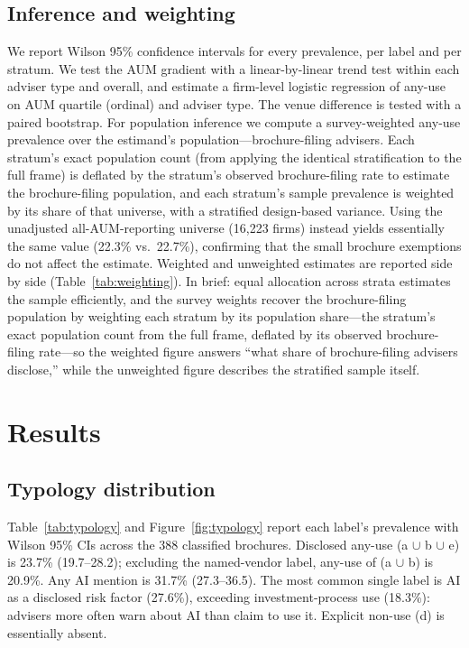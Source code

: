 \documentclass[utf8]{FrontiersinHarvard} %
\begin{document}
\subsection{Inference and weighting}
We report Wilson 95\% confidence intervals for every prevalence, per label and per stratum. We test the AUM gradient with a linear-by-linear trend test within each adviser type and overall, and estimate a firm-level logistic regression of any-use on AUM quartile (ordinal) and adviser type. The venue difference is tested with a paired bootstrap. For population inference we compute a survey-weighted any-use prevalence over the estimand's population---brochure-filing advisers. Each stratum's exact population count (from applying the identical stratification to the full frame) is deflated by the stratum's observed brochure-filing rate to estimate the brochure-filing population, and each stratum's sample prevalence is weighted by its share of that universe, with a stratified design-based variance. Using the unadjusted all-AUM-reporting universe (16{,}223 firms) instead yields essentially the same value (22.3\% vs.\ 22.7\%), confirming that the small brochure exemptions do not affect the estimate. Weighted and unweighted estimates are reported side by side (Table~\ref{tab:weighting}). In brief: equal allocation across strata estimates the sample efficiently, and the survey weights recover the brochure-filing population by weighting each stratum by its population share---the stratum's exact population count from the full frame, deflated by its observed brochure-filing rate---so the weighted figure answers ``what share of brochure-filing advisers disclose,'' while the unweighted figure describes the stratified sample itself.

\section{Results}

\subsection{Typology distribution}
Table~\ref{tab:typology} and Figure~\ref{fig:typology} report each label's prevalence with Wilson 95\% CIs across the 388 classified brochures. Disclosed any-use (a $\cup$ b $\cup$ e) is 23.7\% (19.7--28.2); excluding the named-vendor label, any-use of (a $\cup$ b) is 20.9\%. Any AI mention is 31.7\% (27.3--36.5). The most common single label is AI as a disclosed risk factor (27.6\%), exceeding investment-process use (18.3\%): advisers more often warn about AI than claim to use it. Explicit non-use (d) is essentially absent.
\end{document}
